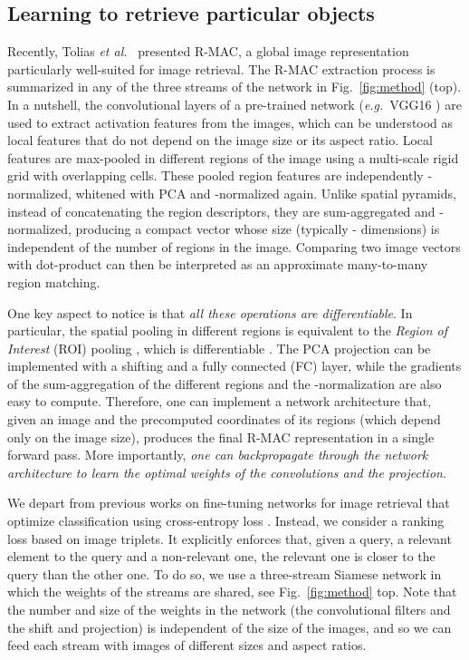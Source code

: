 \documentclass[runningheads]{llncs}
\newcommand{\myparagraph}[1]{\noindent {\bf #1.}}
\def\etal{\emph{et al.}~}
\def\eg{\emph{e.g.}~}
\begin{document}
\subsection{Learning to retrieve particular objects}
\label{sec:learning}
\myparagraph{R-MAC revisited} Recently, Tolias \etal\cite{Tolias2016} presented R-MAC, 
a global image representation particularly well-suited for image retrieval. 
The R-MAC extraction process is summarized in any of the three streams of the network in Fig.~\ref{fig:method} (top).
In a nutshell, the convolutional layers of a pre-trained network (\eg VGG16 \cite{Simonyan2014}) are used to extract
activation features from the images, which can be understood as local features that do not depend on the image size or its aspect ratio. 
Local features are max-pooled in different regions of the image using a multi-scale rigid grid with overlapping cells.
These pooled region features are independently -normalized, whitened with PCA and -normalized again.
Unlike spatial pyramids, instead of concatenating the region descriptors, they are sum-aggregated and -normalized,
producing a compact vector whose size (typically - dimensions) is independent of the number of regions in the
image. 
Comparing two image vectors with dot-product can then be interpreted as an approximate many-to-many region matching.

One key aspect to notice is that \emph{all these operations are differentiable}. In particular, the spatial pooling in
different regions is equivalent to the \emph{Region of Interest} (ROI) pooling \cite{He2014}, which is differentiable
\cite{Girshick2015}. The PCA projection can be implemented with a shifting and a fully connected (FC) layer, while the
gradients of the sum-aggregation of the different regions and the -normalization are also easy to compute.
Therefore, one can implement a network architecture that, given an image and the precomputed coordinates of its regions (which depend only on the image size), produces the final R-MAC representation in a single forward pass. More importantly, \emph{one can backpropagate through the network architecture to learn the optimal weights of the convolutions and the projection}.


\myparagraph{Learning for particular instances}
We depart from previous works on fine-tuning networks for image retrieval that optimize classification using cross-entropy loss \cite{Babenko2014}.
Instead, we consider a ranking loss based on image triplets. It explicitly enforces that, given a query, a relevant element to the query and a non-relevant one, the relevant one is closer to the query than the other one. 
To do so, we use a three-stream Siamese network in which the weights of the streams are shared, see Fig.~\ref{fig:method} top.
Note that the number and size of the weights in the network (the convolutional filters and the shift and projection) is independent of the size of the images, and so we can feed each stream with images of different sizes and aspect ratios.
\end{document}
